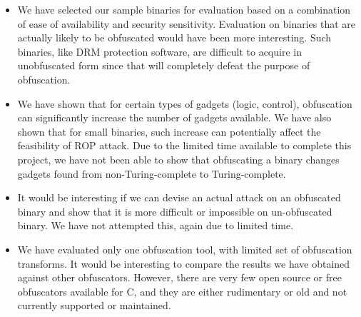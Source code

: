 \begin{itemize}
    \item We have selected our sample binaries for evaluation based on a 
    combination of ease of availability and security sensitivity. 
    Evaluation on binaries that are actually likely to be obfuscated would 
    have been more interesting. Such binaries, like DRM protection 
    software, are difficult to acquire in unobfuscated form since that 
    will completely defeat the purpose of obfuscation. 

    \item We have shown that for certain types of gadgets (logic, 
    control), obfuscation can significantly increase the number of gadgets 
    available. We have also shown that for small binaries, such increase 
    can potentially affect the feasibility of ROP attack. Due to the 
    limited time available to complete this project, we have not been able 
    to show that obfuscating a binary changes gadgets found from 
    non-Turing-complete to Turing-complete.

    \item It would be interesting if we can devise an actual attack on an 
    obfuscated binary and show that it is more difficult or impossible on 
    un-obfuscated binary. We have not attempted this, again due to limited 
    time.


    \item We have evaluated only one obfuscation tool, with limited set of 
    obfuscation transforms. It would be interesting to compare the results 
    we have obtained against other obfuscators. However, there are very 
    few open source or free obfuscators available for C, and they are 
    either rudimentary or old and not currently supported or maintained.
\end{itemize}

